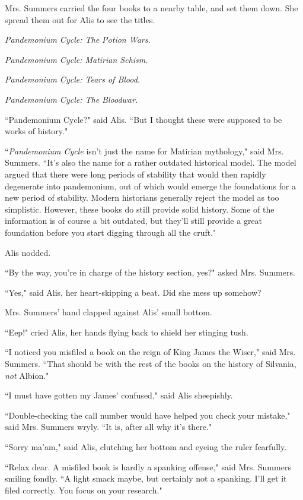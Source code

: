 \documentclass{report}
\begin{document}
Mrs. Summers carried the four books to a nearby table, and set them down. She spread them out for Alis to see the titles.

\textit{Pandemonium Cycle: The Potion Wars.} 

\textit{Pandemonium Cycle: Matirian Schism.} 

\textit{Pandemonium Cycle: Tears of Blood.} 

\textit{Pandemonium Cycle: The Bloodwar.}

``Pandemonium Cycle?" said Alis. ``But I thought these were supposed to be works of history."

``\textit{Pandemonium Cycle} isn't just the name for Matirian mythology," said Mrs. Summers.  ``It's also the name for a rather outdated historical model. The model argued 
that there were long periods of stability that would
then rapidly degenerate into pandemonium, out of which would emerge the foundations for a new period of stability. Modern historians generally reject the model as too
simplistic. However, these books do still provide solid history. Some of the information is of course a 
bit outdated, but they'll still provide a great foundation before you start digging through all the cruft."

Alis nodded.

``By the way, you're in charge of the history section, yes?" asked Mrs. Summers.

``Yes," said Alis, her heart-skipping a beat. Did she mess up somehow?

Mrs. Summers' hand clapped against Alis' small bottom. 

``Eep!" cried Alis, her hands flying back to shield her stinging tush.

``I noticed you misfiled a book on the reign of King James the Wiser," said Mrs. Summers. ``That should be with the rest of the books on the history of Silvania, \textit{not} 
Albion."

``I must have gotten my James' confused," said Alis sheepishly.

``Double-checking the call number would have helped you check your mistake," said Mrs. Summers wryly. ``It is, after all why it's there."

``Sorry ma'am," said Alis, clutching her bottom and eyeing the ruler fearfully.

``Relax dear. A misfiled book is hardly a spanking offense," said Mrs. Summers smiling fondly. ``A light smack maybe, but certainly not a spanking. I'll get it filed 
correctly. You focus on your research."
\end{document}
